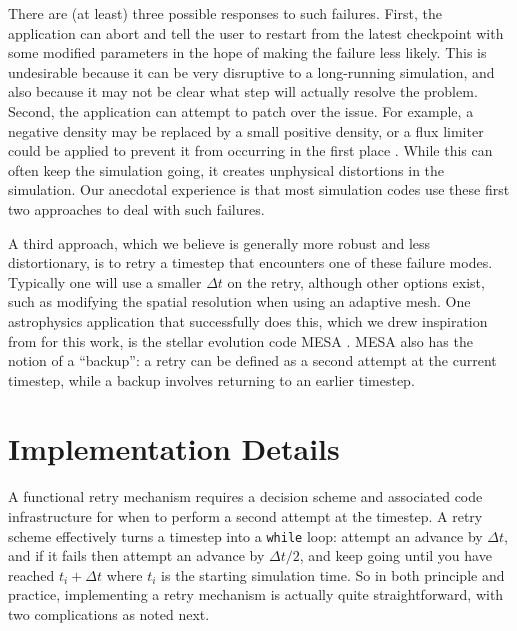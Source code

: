 \documentclass[times,modern]{elsarticle}
\begin{document}
There are (at least) three possible responses to such failures. First, the application can abort and tell the user
to restart from the latest checkpoint with some modified parameters in the hope of making the failure less likely.
This is undesirable because it can be very disruptive to a long-running simulation, and also because it may not be
clear what step will actually resolve the problem. Second, the application can attempt to patch over the issue.
For example, a negative density may be replaced by a small positive density, or a flux limiter could be applied
to prevent it from occurring in the first place \citep{positivity_preserving}. While this can often keep the
simulation going, it creates unphysical distortions in the simulation. Our anecdotal experience is that most
simulation codes use these first two approaches to deal with such failures.

A third approach, which we believe is generally more robust and less distortionary, is to retry a timestep
that encounters one of these failure modes. Typically one will use a smaller $\Delta t$ on the retry, although
other options exist, such as modifying the spatial resolution when using an adaptive mesh. One astrophysics
application that successfully does this, which we drew inspiration from for this work, is the stellar evolution
code MESA \citep{MESA}. MESA also has the notion of a ``backup'': a retry can be defined as a second attempt at
the current timestep, while a backup involves returning to an earlier timestep.

\section{Implementation Details}\label{Sec:Implementation}

A functional retry mechanism requires a decision scheme and associated code infrastructure for when to perform
a second attempt at the timestep. A retry scheme effectively turns a timestep into a \texttt{while} loop: attempt
an advance by $\Delta t$, and if it fails then attempt an advance by $\Delta t / 2$, and keep going until you have
reached $t_{i} + \Delta t$ where $t_{i}$ is the starting simulation time. So in both principle and practice,
implementing a retry mechanism is actually quite straightforward, with two complications as noted next.
\end{document}
